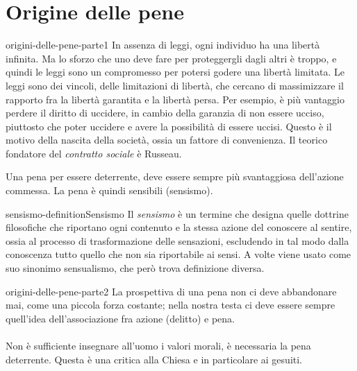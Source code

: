 \documentclass[preview]{standalone}
\begin{document}
\genpage

\section{Origine delle pene}

\begin{snippet}{origini-delle-pene-parte1}
    In assenza di leggi, ogni individuo ha una libertà infinita. Ma lo sforzo che uno deve fare
    per proteggergli dagli altri è troppo, e quindi le leggi sono un compromesso per potersi godere una libertà
    limitata. Le leggi sono dei vincoli, delle limitazioni di libertà, che cercano di massimizzare
    il rapporto fra la libertà garantita e la libertà persa.
    Per esempio, è più vantaggio perdere il diritto di uccidere, in cambio della garanzia
    di non essere ucciso, piuttosto che poter uccidere e avere la possibilità di essere uccisi.
    Questo è il motivo della nascita della società, ossia un fattore di convenienza.
    Il teorico fondatore del \textit{contratto sociale} è Russeau.
    
    Una pena per essere deterrente, deve essere sempre più svantaggiosa dell'azione commessa.
    La pena è quindi sensibili (sensismo).
\end{snippet}

\begin{snippetdefinition}{sensismo-definition}{Sensismo}
    Il \textit{sensismo} è un termine che designa quelle
    dottrine filosofiche che riportano ogni contenuto e la stessa azione del
    conoscere al sentire, ossia al processo di trasformazione delle sensazioni,
    escludendo in tal modo dalla conoscenza tutto quello che non sia riportabile ai sensi.
    A volte viene usato come suo sinonimo sensualismo, che però trova definizione diversa.
\end{snippetdefinition}

\begin{snippet}{origini-delle-pene-parte2}
    La prospettiva di una pena non ci deve abbandonare mai, come una piccola forza costante;
    nella nostra testa ci deve essere sempre quell'idea dell'associazione fra azione (delitto) e pena.
    \\\\
    Non è sufficiente insegnare all'uomo i valori morali, è necessaria la pena deterrente.
    Questa è una critica alla Chiesa e in particolare ai gesuiti. 
\end{snippet}
\end{document}
